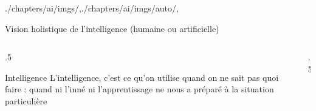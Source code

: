 \begin{graphicspathcontext}{{./chapters/ai/imgs/},{./chapters/ai/imgs/auto/},\old}

\begin{frame}[c]{Vision holistique de l'intelligence (humaine ou artificielle)}
	\begin{columns}
		\begin{column}{.5\linewidth}
			\begin{definitionblock}{Intelligence \cite{piaget1947psychologie}}
				L'intelligence, c'est ce qu'on utilise quand on ne sait pas quoi faire : quand ni l'inné ni l'apprentissage ne nous a préparé à la situation particulière
			\end{definitionblock}
		\end{column}
		\begin{column}{.5\linewidth}
			\hfill
			 \\[.5cm]
			\hfill
		\end{column}
	\end{columns}
\end{frame}

\end{graphicspathcontext}

\endinput

